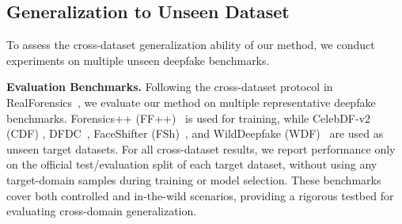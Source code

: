 \documentclass[runningheads]{llncs}
\begin{document}
\subsection{Generalization to Unseen Dataset}
To assess the cross-dataset generalization ability of our method, we conduct experiments on multiple unseen deepfake benchmarks.

\textbf{Evaluation Benchmarks.}
Following the cross-dataset protocol in RealForensics~\cite{haliassos2022leveraging}, we evaluate our method on multiple representative deepfake benchmarks.
Forensics++ (FF++)~\cite{rossler2019faceforensics++} is used for training, while CelebDF-v2 (CDF) \cite{li2020celeb}, DFDC~\cite{dolhansky2020deepfake}, FaceShifter (FSh)~\cite{li2020advancing}, and WildDeepfake (WDF)~\cite{zi2020wilddeepfake} are used as unseen target datasets.
For all cross-dataset results, we report performance only on the official test/evaluation split of each target dataset, without using any target-domain samples during training or model selection.
These benchmarks cover both controlled and in-the-wild scenarios, providing a rigorous testbed for evaluating cross-domain generalization.
\end{document}

